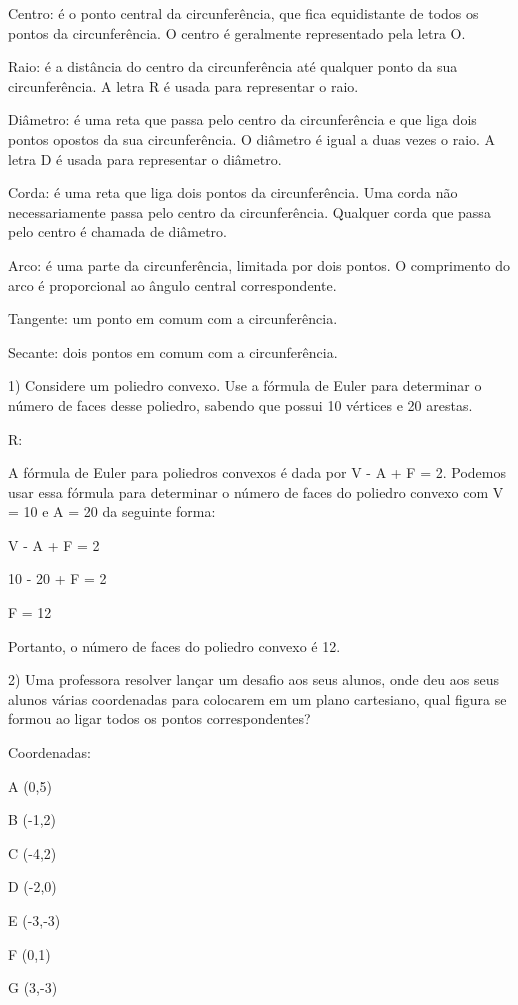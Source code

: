 Centro: é o ponto central da circunferência, que fica equidistante de
todos os pontos da circunferência. O centro é geralmente representado
pela letra O.

Raio: é a distância do centro da circunferência até qualquer ponto da
sua circunferência. A letra R é usada para representar o raio.

Diâmetro: é uma reta que passa pelo centro da circunferência e que liga
dois pontos opostos da sua circunferência. O diâmetro é igual a duas
vezes o raio. A letra D é usada para representar o diâmetro.

Corda: é uma reta que liga dois pontos da circunferência. Uma corda não
necessariamente passa pelo centro da circunferência. Qualquer corda que
passa pelo centro é chamada de diâmetro.

Arco: é uma parte da circunferência, limitada por dois pontos. O
comprimento do arco é proporcional ao ângulo central correspondente.

Tangente: um ponto em comum com a circunferência.

Secante: dois pontos em comum com a circunferência.


1) Considere um poliedro convexo. Use a fórmula de Euler para determinar
o número de faces desse poliedro, sabendo que possui 10 vértices e 20
arestas.

R:

A fórmula de Euler para poliedros convexos é dada por V - A + F = 2.
Podemos usar essa fórmula para determinar o número de faces do poliedro
convexo com V = 10 e A = 20 da seguinte forma:

V - A + F = 2

10 - 20 + F = 2

F = 12

Portanto, o número de faces do poliedro convexo é 12.

2) Uma professora resolver lançar um desafio aos seus alunos, onde deu
aos seus alunos várias coordenadas para colocarem em um plano
cartesiano, qual figura se formou ao ligar todos os pontos
correspondentes?

Coordenadas:

A (0,5)

B (-1,2)

C (-4,2)

D (-2,0)

E (-3,-3)

F (0,1)

G (3,-3)

